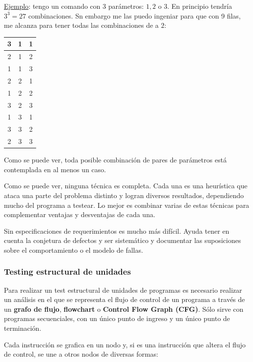 \documentclass[]{article}
\begin{document}
\underline{Ejemplo}: tengo un comando con $3$ parámetros: $1, 2$ o $3$. En principio tendría $3^3=27$ combinaciones. Sn embargo me las puedo ingeniar para que con 9 filas, me alcanza para tener todas las combinaciones de a $2$:

\begin{center}
	\begin{tabular}{|c|c|c|}
	\hline
	3 & 1 & 1\\
	\hline
	2 & 1 & 2\\
	\hline
	1 & 1 & 3\\
	\hline
	2 & 2 & 1\\
	\hline
	1 & 2 & 2\\
	\hline
	3 & 2 & 3\\
	\hline
	1 & 3 & 1\\
	\hline
	3 & 3 & 2\\
	\hline
	2 & 3 & 3\\
	\hline
	\end{tabular}
\end{center}

Como se puede ver, toda posible combinación de pares de parámetros está contemplada en al menos un caso.

Como se puede ver, ninguna técnica es completa. Cada una es una heurística que ataca una parte del problema distinto y logran diversos resultados, dependiendo mucho del programa a testear. Lo mejor es combinar varias de estas técnicas para complementar ventajas y desventajas de cada una.

Sin especificaciones de requerimientos es mucho más difícil. Ayuda tener en cuenta la conjetura de defectos y ser sistemático y documentar las suposiciones sobre el comportamiento o el modelo de fallas.

\subsubsection{Testing estructural de unidades}
Para realizar un test estructural de unidades de programas es necesario realizar un análisis en el que se representa el flujo de control de un programa a través de un \textbf{grafo de flujo}, \textbf{flowchart} o \textbf{Control Flow Graph (CFG)}. Sólo sirve con programas secuenciales, con un único punto de ingreso y un único punto de terminación.

Cada instrucción se grafica en un nodo y, si es una instrucción que altera el flujo de control, se une a otros nodos de diversas formas:
\end{document}
